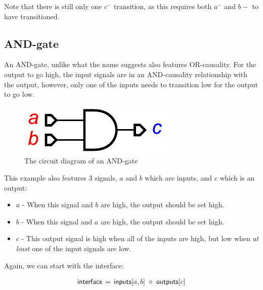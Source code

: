 \documentclass[british, journal]{IEEEtran}
\begin{document}
Note that there is still only one $c^{-}$ transition, as this requires both
$a^{-}$ and $b{-}$ to have transitioned. 

\subsection{AND-gate}

An AND-gate, unlike what the name suggests also features OR-causality. 
For the output to go high, the input signals are in an AND-causality relationship
with the output, however, only one of the inputs needs to transition low for the 
output to go low. 

\vspace{-3mm}

\begin{figure}[h]
\begin{centering}
\includegraphics[scale=0.55]{Images/and-gate-circuit}
\par\end{centering}

\protect\caption{\label{fig:or-gate-circuit} The circuit diagram of an AND-gate}
\vspace{-3mm}
\end{figure}

This example also features 3 signals, $a$ and $b$ which are inputs, and $c$
which is an output:

\begin{itemize}
  \item $a$ - When this signal and $b$ are high, the output should be set high.
  \item $b$ - When this signal and $a$ are high, the output should be set high.
  \item $c$ - This output signal is high when all of the inputs are high, but low when
		\emph{at least} one of the input signals are low.
\end{itemize}

Again, we can start with the interface: 

\[
\begin{array}{lcl}
\mathsf{interface}&\hspace{-2mm}=&\hspace{-2mm}\mathsf{inputs}[a, b]~\diamond~\mathsf{outputs}[c]
\end{array}
\]
\end{document}
